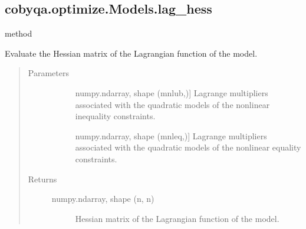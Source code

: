 \documentclass[letterpaper,10pt,english]{sphinxmanual}
\begin{document}
\begin{fulllineitems}
\begin{fulllineitems}
\end{fulllineitems}



\subsection{cobyqa.optimize.Models.lag\_hess}
\label{\detokenize{refs/generated/cobyqa.optimize.Models.lag_hess:cobyqa-optimize-models-lag-hess}}\label{\detokenize{refs/generated/cobyqa.optimize.Models.lag_hess::doc}}
\sphinxAtStartPar
method

\begin{fulllineitems}
\label{\detokenize{refs/generated/cobyqa.optimize.Models.lag_hess:cobyqa.optimize.Models.lag_hess}}
\sphinxAtStartPar
Evaluate the Hessian matrix of the Lagrangian function of the model.
\begin{quote}\begin{description}
\item[{Parameters}] \leavevmode\begin{description}
\item[{}] \leavevmode{[}numpy.ndarray, shape (mnlub,){]}
\sphinxAtStartPar
Lagrange multipliers associated with the quadratic models of the
nonlinear inequality constraints.

\item[{}] \leavevmode{[}numpy.ndarray, shape (mnleq,){]}
\sphinxAtStartPar
Lagrange multipliers associated with the quadratic models of the
nonlinear equality constraints.

\end{description}

\item[{Returns}] \leavevmode\begin{description}
\item[{numpy.ndarray, shape (n, n)}] \leavevmode
\sphinxAtStartPar
Hessian matrix of the Lagrangian function of the model.

\end{description}

\end{description}\end{quote}


\end{fulllineitems}
\end{fulllineitems}
\end{document}
